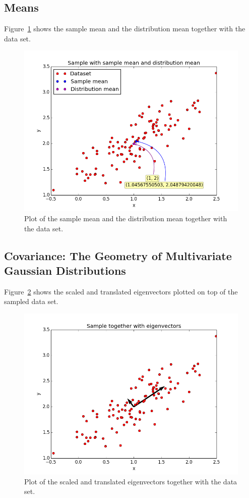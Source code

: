 \documentclass[a4paper]{article}
\begin{document}
\subsection{Means}
Figure~\ref{fig:samples_with_mean} shows the sample mean and the distribution mean together with the data set.

\begin{figure}[H]
  \centering
  \includegraphics[width=.7\linewidth]{figures/samples_with_mean.png}
  \caption{Plot of the sample mean and the distribution mean together with the data set.}
  \label{fig:samples_with_mean}
\end{figure}

\subsection{Covariance: The Geometry of Multivariate Gaussian Distributions}
Figure~\ref{fig:samples_with_eigenvectors} shows the scaled and translated eigenvectors plotted on top of the sampled data set.

\begin{figure}[H]
  \centering
  \includegraphics[width=.7\linewidth]{figures/samples_with_eigenvectors.png}
  \caption{Plot of the scaled and translated eigenvectors together with the data set.}
  \label{fig:samples_with_eigenvectors}
\end{figure}
\end{document}
